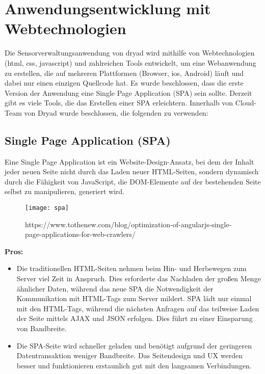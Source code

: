 \section{Anwendungsentwicklung mit Webtechnologien}

Die Sensorverwaltungsanwendung von dryad wird mithilfe von Webtechnologien (html, css, javascript) und zahlreichen Tools entwickelt, um eine Webanwendung zu erstellen, die auf mehreren Plattformen (Browser, ios, Android) läuft und dabei nur einen einzigen Quellcode hat.
Es wurde beschlossen, dass die erste Version der Anwendung eine Single Page Application (SPA) sein sollte.
Derzeit gibt es viele Tools, die das Erstellen einer SPA erleichtern. Innerhalb von Cloud-Team von Dryad wurde beschlossen, die folgenden zu verwenden:

\subsection{Single Page Application (SPA)}

Eine Single Page Application ist ein Website-Design-Ansatz, bei dem der Inhalt jeder neuen Seite nicht durch das Laden neuer HTML-Seiten, sondern dynamisch durch die Fähigkeit von JavaScript, die \ac{DOM}-Elemente auf der bestehenden Seite selbst zu manipulieren, generiert wird.

\begin{figure}[h]
  \centering
  \texttt{[image: spa]}
  \caption{https://www.tothenew.com/blog/optimization-of-angularjs-single-page-applications-for-web-crawlers/}
  \label{fig:spa}
\end{figure}

\textbf{Pros:}

\begin{itemize}
  \item Die traditionellen HTML-Seiten nehmen beim Hin- und Herbewegen zum Server viel Zeit in Anspruch. Dies erforderte das Nachladen der großen Menge ähnlicher Daten, während das neue SPA die Notwendigkeit der Kommunikation mit HTML-Tags zum Server mildert. SPA lädt nur einmal mit den HTML-Tags, während die nächsten Anfragen auf das teilweise Laden der Seite mittels AJAX und JSON erfolgen. Dies führt zu einer Einsparung von Bandbreite.
  \item Die SPA-Seite wird schneller geladen und benötigt aufgrund der geringeren Datentransaktion weniger Bandbreite. Das Seitendesign und UX werden besser und funktionieren erstaunlich gut mit den langsamen Verbindungen.
\end{itemize}

